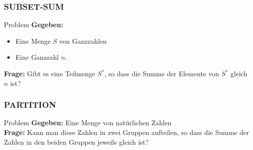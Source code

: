 \begin{frame}
\frametitle{SUBSET-SUM}
\begin{block}{Problem}
\textbf{Gegeben:}
\begin{itemize}
 \item Eine Menge $S$ von Ganzzahlen
 \item Eine Ganzzahl $n$.
\end{itemize}
\textbf{Frage:}
Gibt es eine Teilmenge $S^*$, so dass die Summe der Elemente von $S^*$ gleich $n$ ist?
\end{block}
\end{frame}
\begin{frame}
\frametitle{PARTITION}
\begin{block}{Problem}
\textbf{Gegeben:} Eine Menge von natürlichen Zahlen\\
\textbf{Frage:} Kann man diese Zahlen in zwei Gruppen aufteilen, so dass die Summe der Zahlen in den beiden Gruppen jeweils gleich ist?
\end{block}
\end{frame}


